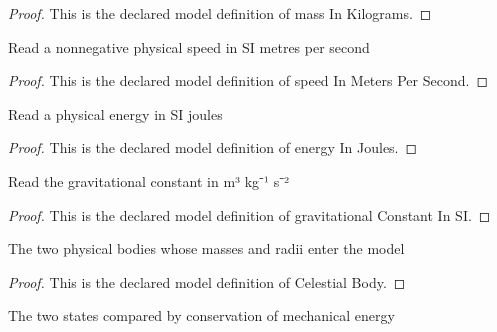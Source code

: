 \begin{proof}
  This is the declared model definition of mass In Kilograms.
\end{proof}
\begin{definition}
  \label{def:physics:phyx-mini-0708:phyxminiproblems-problemphyxmini0708-speedinmeterspersecond}
  Read a nonnegative physical speed in SI metres per second
\end{definition}
\begin{proof}
  This is the declared model definition of speed In Meters Per Second.
\end{proof}
\begin{definition}
  \label{def:physics:phyx-mini-0708:phyxminiproblems-problemphyxmini0708-energyinjoules}
  Read a physical energy in SI joules
\end{definition}
\begin{proof}
  This is the declared model definition of energy In Joules.
\end{proof}
\begin{definition}
  \label{def:physics:phyx-mini-0708:phyxminiproblems-problemphyxmini0708-gravitationalconstantinsi}
  Read the gravitational constant in m³ kg⁻¹ s⁻²
\end{definition}
\begin{proof}
  This is the declared model definition of gravitational Constant In SI.
\end{proof}
\begin{definition}
  \label{def:physics:phyx-mini-0708:phyxminiproblems-problemphyxmini0708-celestialbody}
  The two physical bodies whose masses and radii enter the model
\end{definition}
\begin{proof}
  This is the declared model definition of Celestial Body.
\end{proof}
\begin{definition}
  \label{def:physics:phyx-mini-0708:phyxminiproblems-problemphyxmini0708-fallstate}
  The two states compared by conservation of mechanical energy
\end{definition}
